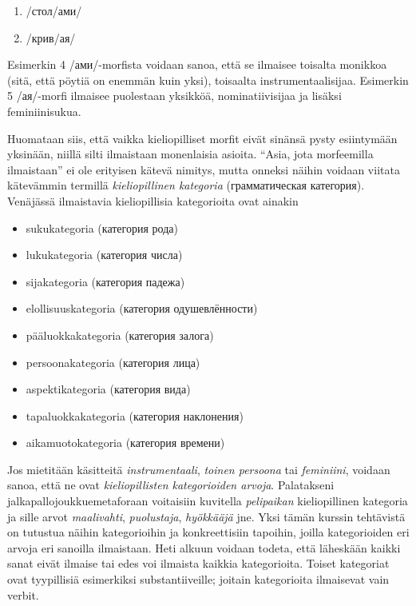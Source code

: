 \documentclass[]{scrartcl}
\providecommand{\tightlist}{%
  \setlength{\itemsep}{0pt}\setlength{\parskip}{0pt}}
\begin{document}
\begin{enumerate}
\def\labelenumi{(\arabic{enumi})}
\setcounter{enumi}{3}
\tightlist
\item
  /стол/ами/
\item
  /крив/ая/
\end{enumerate}

Esimerkin 4 /ами/-morfista voidaan sanoa, että se ilmaisee toisalta
monikkoa (sitä, että pöytiä on enemmän kuin yksi), toisaalta
instrumentaalisijaa. Esimerkin 5 /ая/-morfi ilmaisee puolestaan
yksikköä, nominatiivisijaa ja lisäksi feminiinisukua.

Huomataan siis, että vaikka kieliopilliset morfit eivät sinänsä pysty
esiintymään yksinään, niillä silti ilmaistaan monenlaisia asioita.
``Asia, jota morfeemilla ilmaistaan'' ei ole erityisen kätevä nimitys,
mutta onneksi näihin voidaan viitata kätevämmin termillä
\emph{kieliopillinen kategoria} (грамматическая категория). Venäjässä
ilmaistavia kieliopillisia kategorioita ovat ainakin

\begin{itemize}
\tightlist
\item
  sukukategoria (категория рода)
\item
  lukukategoria (категория числа)
\item
  sijakategoria (категория падежа)
\item
  elollisuuskategoria (категория одушевлённости)
\item
  pääluokkakategoria (категория залога)
\item
  persoonakategoria (категория лица)
\item
  aspektikategoria (категория вида)
\item
  tapaluokkakategoria (категория наклонения)
\item
  aikamuotokategoria (категория времени)
\end{itemize}

Jos mietitään käsitteitä \emph{instrumentaali}, \emph{toinen persoona}
tai \emph{feminiini}, voidaan sanoa, että ne ovat \emph{kieliopillisten
kategorioiden arvoja}. Palatakseni jalkapallojoukkuemetaforaan
voitaisiin kuvitella \emph{pelipaikan} kieliopillinen kategoria ja sille
arvot \emph{maalivahti}, \emph{puolustaja}, \emph{hyökkääjä} jne. Yksi
tämän kurssin tehtävistä on tutustua näihin kategorioihin ja
konkreettisiin tapoihin, joilla kategorioiden eri arvoja eri sanoilla
ilmaistaan. Heti alkuun voidaan todeta, että läheskään kaikki sanat
eivät ilmaise tai edes voi ilmaista kaikkia kategorioita. Toiset
kategoriat ovat tyypillisiä esimerkiksi substantiiveille; joitain
kategorioita ilmaisevat vain verbit.
\end{document}
